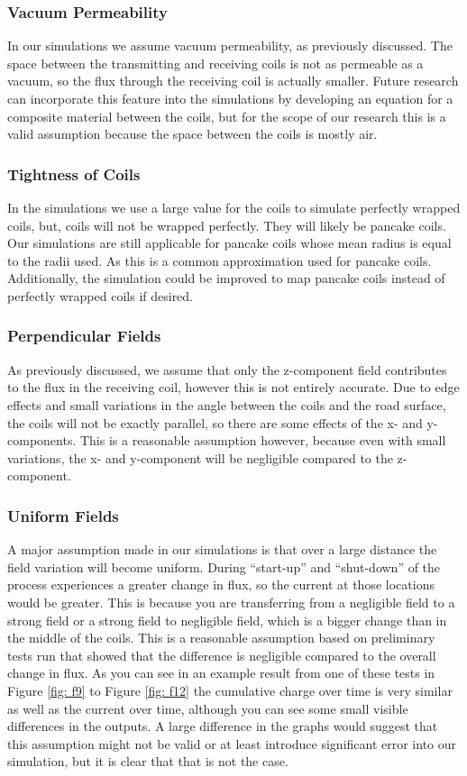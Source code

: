 \subsubsection{Vacuum Permeability}
In our simulations we assume vacuum permeability, as previously discussed. 
The space between the transmitting and receiving coils is not as permeable as a vacuum, 
so the flux through the receiving coil is actually smaller. Future research can incorporate 
this feature into the simulations by developing an equation for a composite material between the coils, 
but for the scope of our research this is a valid assumption because the space between the coils is mostly air.

\subsubsection{Tightness of Coils}
In the simulations we use a large value for the coils to simulate perfectly wrapped coils, but, 
coils will not be wrapped perfectly. They will likely be pancake coils. Our simulations are still applicable 
for pancake coils whose mean radius is equal to the radii used. As this is a common approximation used 
for pancake coils. Additionally, the simulation could be improved to map pancake coils instead of perfectly 
wrapped coils if desired. 

\subsubsection{Perpendicular Fields}
As previously discussed, we assume that only the z-component field contributes to the flux in the receiving coil, 
however this is not entirely accurate. Due to edge effects and small variations in the angle between the coils 
and the road surface, the coils will not be exactly parallel, so there are some effects of the x- and y-components. 
This is a reasonable assumption however, because even with small variations, the x- and y-component will 
be negligible compared to the z-component. 

\subsubsection{Uniform Fields}
A major assumption made in our simulations is that over a large distance the field variation will become uniform. 
During “start-up” and “shut-down” of the process experiences a greater change in flux, so the current at those 
locations would be greater. This is because you are transferring from a negligible field to a strong field or 
a strong field to negligible field, which is a bigger change than in the middle of the coils. 
This is a reasonable assumption based on preliminary tests run that showed that the difference is 
negligible compared to the overall change in flux.  As you can see in an example result from one of these tests 
in Figure \ref{fig: f9} to Figure \ref{fig: f12} the cumulative charge over time is very similar as well as the current over time, 
although you can see some small visible differences in the outputs. A large difference in the graphs would 
suggest that this assumption might not be valid or at least introduce significant error into our simulation, 
but it is clear that that is not the case. 

